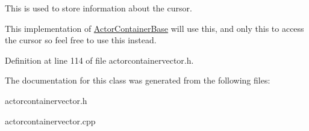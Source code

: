 This is used to store information about the cursor. 

This implementation of \hyperlink{classphys_1_1ActorContainerBase}{ActorContainerBase} will use this, and only this to access the cursor so feel free to use this instead. 

Definition at line 114 of file actorcontainervector.h.



The documentation for this class was generated from the following files:\begin{DoxyCompactItemize}
\item 
actorcontainervector.h\item 
actorcontainervector.cpp\end{DoxyCompactItemize}
